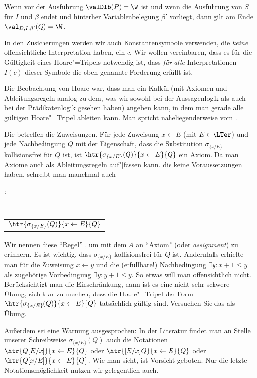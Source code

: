 Wenn vor der Ausführung $\valDIb(P)=\W$ ist und wenn die
Ausführung von $S$ für $I$ und $\beta$ endet und hinterher
Variablenbelegung $\beta'$ vorliegt, dann gilt am Ende
$\val_{D,I,\beta'}(Q)=\W$.

In den Zusicherungen werden wir auch Konstantensymbole verwenden, die
\emph{keine} offensichtliche Interpretation haben, \zB ein $c$.
%
Wir wollen vereinbaren, dass es für die Gültigkeit eines
Hoare"=Tripels notwendig ist, dass \emph{für alle} Interpretationen
$I(c)$ dieser Symbole die oben genannte Forderung erfüllt ist.

Die Beobachtung von Hoare war, dass man ein Kalkül (mit Axiomen und
Ableitungsregeln analog zu dem, was wir sowohl bei der Aussagenlogik
als auch bei der Prädikatenlogik gesehen haben) angeben kann, in dem
man gerade alle gültigen Hoare"=Tripel ableiten kann.
%
Man spricht naheliegenderweise vom
.

Die %
 betreffen die Zuweisungen.
%
Für jede Zuweisung $x\gets E$ (mit $E\in\LTer$) und jede Nachbedingung
$Q$ mit der Eigenschaft, dass die Substitution $\sigma_{\{x/E\}}$
kollisionsfrei für $Q$ ist, ist
$\htr{\sigma_{\{x/E\}}(Q)}{x\gets E}{Q}$ ein Axiom.
%
Da man Axiome auch als Ableitungsregeln auf"|fassen kann, die keine
Voraussetzungen haben, schreibt man manchmal auch

: \quad \begin{tabular}{c}
                \mbox{ } \\
                \midrule
                $\htr{\sigma_{\{x/E\}}(Q)}{x\gets E}{Q}$
              \end{tabular}

\noindent
Wir nennen diese "`Regel"' , um mit dem $A$ an "`Axiom"' (oder
\emph{assignment}) zu erinnern.
%
Es ist wichtig, dass $\sigma_{\{x/E\}}$ kollisionsfrei für $Q$ ist.
%
Andernfalls erhielte man für die Zuweisung $x\gets y$ und die
(erfüllbare!) Nachbedingung $\exists y : x+1 \leq y$ als zugehörige
Vorbedingung $\exists y : y+1 \leq y$.
%
So etwas will man offensichtlich nicht.
%
Berücksichtigt man die Einschränkung, dann ist es eine nicht sehr
schwere Übung, sich klar zu machen, dass die Hoare"=Tripel der Form
$\htr{\sigma_{\{x/E\}}(Q)}{x\gets E}{Q}$ tatsächlich gültig sind.
%
Versuchen Sie das als Übung.

Außerdem sei eine Warnung ausgesprochen:
%
In der Literatur findet man an Stelle unserer Schreibweise
$\sigma_{\{x/E\}}(Q)$ auch die Notationen $\htr{Q[E/x]}{x\gets E}{Q}$
oder $\htr{[E/x]Q}{x\gets E}{Q}$ oder $\htr{Q[x/E]}{x\gets E}{Q}$.
%
Wie man sieht, ist Vorsicht geboten.
%
Nur die letzte Notationsmöglichkeit nutzen wir gelegentlich auch.

